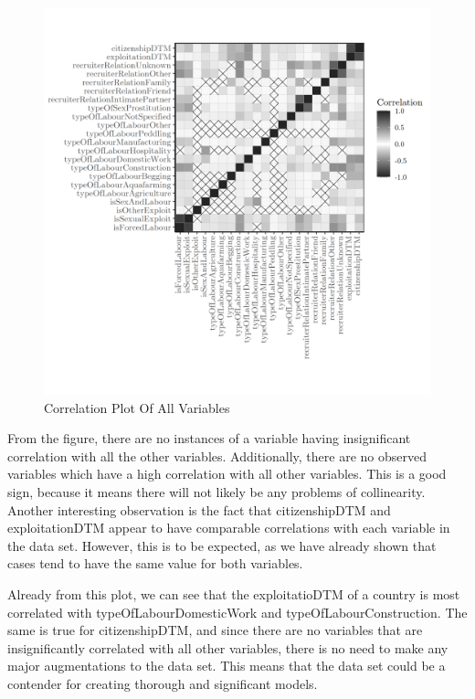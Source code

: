\documentclass{article} %
\begin{document}
\FloatBarrier
\begin{figure}[H]
	\includegraphics[width = \textwidth]{CorrPlot}
	\caption{Correlation Plot Of All Variables}
	\label{fig:CorPlot}
\end{figure}
\FloatBarrier

From the figure, there are no instances of a variable having insignificant correlation with all the other variables. Additionally, there are no observed variables which have a high correlation with all other variables. This is a good sign, because it means there will not likely be any problems of collinearity. Another interesting observation is the fact that citizenshipDTM and exploitationDTM appear to have comparable correlations with each variable in the data set. However, this is to be expected, as we have already shown that cases tend to have the same value for both variables. 

Already from this plot, we can see that the exploitatioDTM of a country is most correlated with typeOfLabourDomesticWork and typeOfLabourConstruction. The same is true for citizenshipDTM, and since there are no variables that are insignificantly correlated with all other variables, there is no need to make any major augmentations to the data set. This means that the data set could be a contender for creating thorough and significant models.
\end{document}
